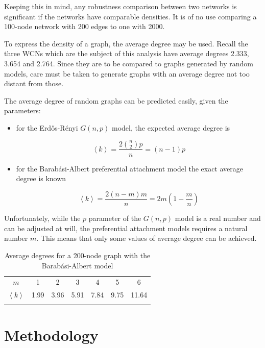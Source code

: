 \documentclass[oneside,openany]{memoir}
\begin{document}
Keeping this in mind, any robustness comparison between two networks is
significant if the networks have comparable densities. It is of no use
comparing a 100-node network with 200 edges to one with 2000.

To express the density of a graph, the average degree may be used.
Recall the three WCNs which are the subject of this analysis have
average degrees 2.333, 3.654 and 2.764. Since they are to be compared to
graphs generated by random models, care must be taken to generate graphs
with an average degree not too distant from those.

The average degree of random graphs can be predicted easily, given the
parameters:

\begin{itemize}
\item
  for the Erd\H{o}s-Rényi $G(n,p)$ model, the expected average degree is

  \begin{equation}
  \left< k \right> = \frac{2 \binom{n}{2} p}{n} = (n-1)p
  \end{equation}
\item
  for the Barabási-Albert preferential attachment model the exact
  average degree is known

  \begin{equation}
  \left< k \right> = \frac{2 (n-m)m}{n} = 2m\left( 1 - \frac{m}{n} \right)
  \end{equation}
\end{itemize}

Unfortunately, while the $p$ parameter of the $G(n,p)$ model is a real
number and can be adjusted at will, the preferential attachment models
requires a natural number $m$. This means that only some values of
average degree can be achieved.

\begin{longtable}[c]{@{}ccccccc@{}}
\toprule\addlinespace
$m$ & 1 & 2 & 3 & 4 & 5 & 6
\\\addlinespace
$\left< k \right>$ & 1.99 & 3.96 & 5.91 & 7.84 & 9.75 & 11.64
\\\addlinespace
\bottomrule
\addlinespace
\caption{Average degrees for a 200-node graph with the Barabási-Albert
model}
\end{longtable}

\section{Methodology}\label{methodology}
\end{document}
